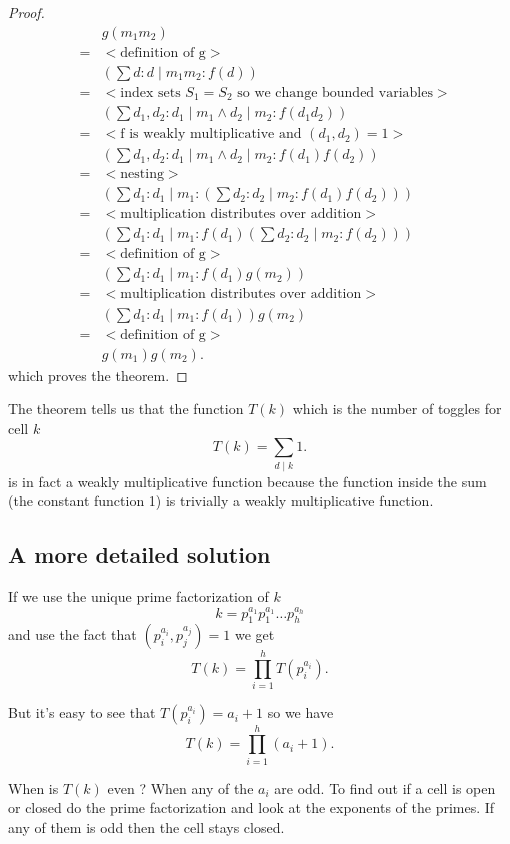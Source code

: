 \begin{proof}
\[
   \begin{array}{lcl}
		&&g(m_1 m_2) \\
	      &=& { < \mbox{definition of g} >} \\      
                  &&(\sum d: d \mid m_1 m_2 : f(d)) \\
       	      &=& { < \mbox{index sets }S_1 = S_2\mbox{ so we change bounded variables}  >} \\
                  && (\sum d_1, d_2: d_1 \mid m_1 \wedge d_2 \mid m_2 : f(d_1 d_2)) \\
 	       &=& { < \mbox{f is weakly multiplicative and } (d_1, d_2) = 1 > }  \\
	         && (\sum d_1, d_2: d_1 \mid m_1 \wedge d_2 \mid m_2 : f(d_1) f(d_2))\\
	        &=& { < \mbox{nesting}  > }  \\ 
	        && (\sum d_1: d_1 \mid m_1 : (\sum d_2: d_2 \mid m_2: f(d_1) f(d_2))) \\
	        &=& { < \mbox{multiplication distributes over addition}  > }  \\
	         && (\sum d_1: d_1 \mid m_1 : f(d_1) (\sum d_2: d_2 \mid m_2: f(d_2))) \\
	        &=& { < \mbox{definition of g}  > }  \\ 
	        && (\sum d_1: d_1 \mid m_1 : f(d_1) g(m_2)) \\
	        &=& { < \mbox{multiplication distributes over addition}  > }  \\
	        	&& (\sum d_1: d_1 \mid m_1 : f(d_1)) g(m_2) \\
		&=& { < \mbox{definition of g}  > }  \\ 
		&& g(m_1) g(m_2).
   \end{array}
\]
which proves the theorem.
\end{proof}

The theorem tells us that the function $T(k)$ which is the number of toggles for cell $k$
\[	 
	T(k) = \sum_{d \mid k} 1.
\]
is in fact a weakly multiplicative function because the function inside the sum (the constant function 1) is trivially a weakly multiplicative function.

\subsection{A more detailed solution}

If we use the unique prime factorization of $k$
\[
	k = p_1^{a_1} p_1^{a_1} \dots p_h^{a_h}
\]
and use the fact that $(p_i^{a_i}, p_j^{a_j}) = 1$ we get
\[
	T(k) = \prod_{i  = 1}^h T(p_i^{a_i}).
\]		 

But it's easy to see that $T(p_i^{a_i}) = a_i + 1$ so we have
\[
	T(k) = \prod_{i  = 1}^h (a_i + 1).
\]

When is $T(k)$ even ? When any of the $a_i$ are odd. To find out if a cell is open or closed do the prime factorization and look at the exponents of the primes. If any of them is odd then the cell stays closed.	
